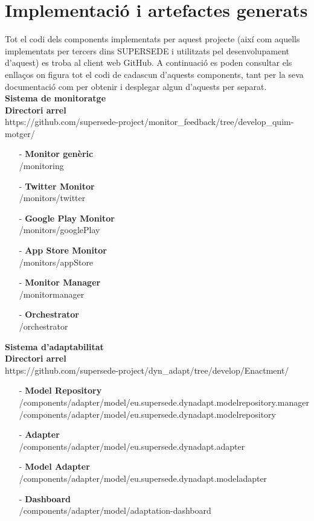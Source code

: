 \section{Implementació i artefactes generats}

Tot el codi dels components implementats per aquest projecte (així com aquells implementats per tercers dins SUPERSEDE i utilitzats pel desenvolupament d'aquest) es troba al client web GitHub. A continuació es poden consultar els enllaços on figura tot el codi de cadascun d'aquests components, tant per la seva documentació com per obtenir i desplegar algun d'aquests per separat.\\

\noindent \textbf{\large Sistema de monitoratge}\\

\noindent \textbf{Directori arrel}\\
https://github.com/supersede-project/monitor\_feedback/tree/develop\_quim-motger/

\begin{itemize}
\item[-] \textbf{Monitor genèric}\\
/monitoring
\item[-] \textbf{Twitter Monitor}\\
/monitors/twitter
\item[-] \textbf{Google Play Monitor}\\
/monitors/googlePlay
\item[-] \textbf{App Store Monitor}\\
/monitors/appStore
\item[-] \textbf{Monitor Manager}\\
/monitormanager
\item[-] \textbf{Orchestrator}\\
/orchestrator
\end{itemize}

\noindent \textbf{\large Sistema d'adaptabilitat}\\

\noindent \textbf{Directori arrel}\\
https://github.com/supersede-project/dyn\_adapt/tree/develop/Enactment/

\begin{itemize}
\item[-] \textbf{Model Repository}\\
/components/adapter/model/eu.supersede.dynadapt.modelrepository.manager\\
/components/adapter/model/eu.supersede.dynadapt.modelrepository
\item[-] \textbf{Adapter}\\
/components/adapter/model/eu.supersede.dynadapt.adapter
\item[-] \textbf{Model Adapter}\\
/components/adapter/model/eu.supersede.dynadapt.modeladapter
\item[-] \textbf{Dashboard}\\
/components/adapter/model/adaptation-dashboard
\end{itemize}